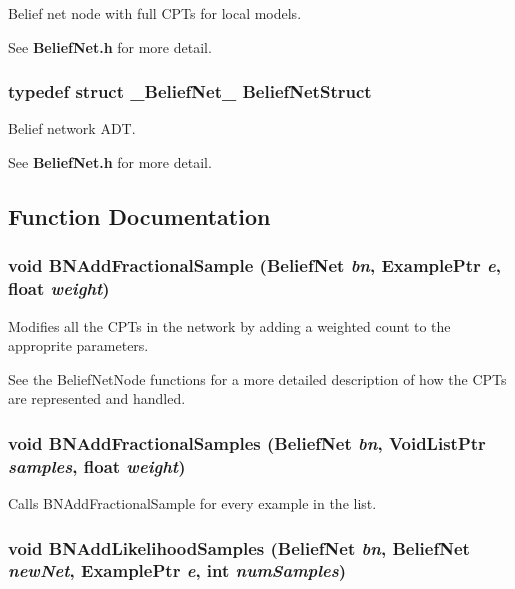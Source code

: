 Belief net node with full CPTs for local models. 

See {\bf Belief\-Net.h} for more detail. 
\subsubsection{\setlength{\rightskip}{0pt plus 5cm}typedef struct {\bf \_\-Belief\-Net\_\-}  {\bf Belief\-Net\-Struct}}\label{BeliefNet_8h_a4}


Belief network ADT. 

See {\bf Belief\-Net.h} for more detail. 

\subsection{Function Documentation}
\subsubsection{\setlength{\rightskip}{0pt plus 5cm}void BNAdd\-Fractional\-Sample ({\bf Belief\-Net} {\em bn}, {\bf Example\-Ptr} {\em e}, float {\em weight})}\label{BeliefNet_8h_a64}


Modifies all the CPTs in the network by adding a weighted count to the approprite parameters. 

See the Belief\-Net\-Node functions for a more detailed description of how the CPTs are represented and handled. 
\subsubsection{\setlength{\rightskip}{0pt plus 5cm}void BNAdd\-Fractional\-Samples ({\bf Belief\-Net} {\em bn}, {\bf Void\-List\-Ptr} {\em samples}, float {\em weight})}\label{BeliefNet_8h_a65}


Calls BNAdd\-Fractional\-Sample for every example in the list. 

\subsubsection{\setlength{\rightskip}{0pt plus 5cm}void BNAdd\-Likelihood\-Samples ({\bf Belief\-Net} {\em bn}, {\bf Belief\-Net} {\em new\-Net}, {\bf Example\-Ptr} {\em e}, int {\em num\-Samples})}\label{BeliefNet_8h_a91}


